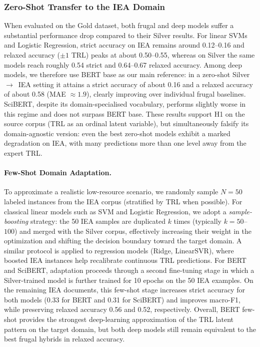\documentclass[runningheads]{llncs}
\begin{document}
\subsubsection{Zero-Shot Transfer to the IEA Domain}

When evaluated on the Gold dataset, both frugal and deep models suffer a substantial performance drop compared to their Silver results. For linear SVMs and Logistic Regression, strict accuracy on IEA remains around 0.12--0.16 and relaxed accuracy ($\pm 1$ TRL) peaks at about 0.50--0.55, whereas on Silver the same models reach roughly 0.54 strict and 0.64--0.67 relaxed accuracy. Among deep models, we therefore use BERT base as our main reference: in a zero-shot Silver~$\to$~IEA setting it attains a strict accuracy of about 0.16 and a relaxed accuracy of about 0.58 (MAE $\approx 1.9$), clearly improving over individual frugal baselines. SciBERT, despite its domain-specialised vocabulary, performs slightly worse in this regime and does not surpass BERT base. These results support H1 on the source corpus (TRL as an ordinal latent variable), but simultaneously falsify its domain-agnostic version: even the best zero-shot models exhibit a marked degradation on IEA, with many predictions more than one level away from the expert TRL.

\paragraph{Few-Shot Domain Adaptation.}
To approximate a realistic low-resource scenario, we randomly sample $N=50$ labeled instances from the IEA corpus (stratified by TRL when possible).
For classical linear models such as SVM and Logistic Regression, we adopt a \emph{sample-boosting} strategy: the 50 IEA samples are duplicated $k$ times (typically $k=50$–$100$) and merged with the Silver corpus, effectively increasing their weight in the optimization and shifting the decision boundary toward the target domain. A similar protocol is applied to regression models (Ridge, LinearSVR), where boosted IEA instances help recalibrate continuous TRL predictions. For BERT and SciBERT, adaptation proceeds through a second fine-tuning stage in which a Silver-trained model is further trained for 10 epochs on the 50 IEA examples. On the remaining IEA documents, this few-shot stage increases strict accuracy for both models (0.33 for BERT and 0.31 for SciBERT) and improves macro-F1, while preserving relaxed accuracy 0.56 and 0.52, respectively. Overall, BERT few-shot provides the strongest deep-learning approximation of the TRL latent pattern on the target domain, but both deep models still remain equivalent to the best frugal hybrids in relaxed accuracy.
\end{document}
